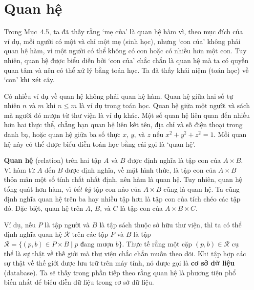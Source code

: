 \section{Quan hệ}

Trong Mục~4.5, ta đã thấy rằng `mẹ của' là quan hệ hàm vì, theo mục đích của ví dụ, mỗi người có một và chỉ một mẹ (sinh học), nhưng `con của' không phải quan hệ hàm, vì một người có thể không có con hoặc có nhiều hơn một con. Tuy nhiên, quan hệ được biểu diễn bởi `con của' chắc chắn là quan hệ mà ta có quyền quan tâm và nên có thể xử lý bằng toán học. Ta đã thấy khái niệm (toán học) về `con' khi xét cây.

Có nhiều ví dụ về quan hệ không phải quan hệ hàm. Quan hệ giữa hai số tự nhiên $n$ và $m$ khi $n \le m$ là ví dụ trong toán học. Quan hệ giữa một người và sách mà người đó mượn từ thư viện là ví dụ khác. Một số quan hệ liên quan đến nhiều hơn hai thực thể, chẳng hạn quan hệ liên kết tên, địa chỉ và số điện thoại trong danh bạ, hoặc quan hệ giữa ba số thực $x$, $y$, và $z$ nếu $x^2 + y^2 + z^2 = 1$. Mỗi quan hệ này có thể được biểu diễn toán học bằng cái gọi là `quan hệ'.

\textbf{Quan hệ} (relation) trên hai tập $A$ và $B$ được định nghĩa là tập con của $A \times B$. Vì hàm từ $A$ đến $B$ được định nghĩa, về mặt hình thức, là tập con của $A \times B$ thỏa mãn một số tính chất nhất định, nên hàm là quan hệ. Tuy nhiên, quan hệ tổng quát hơn hàm, vì \emph{bất kỳ} tập con nào của $A \times B$ cũng là quan hệ. Ta cũng định nghĩa quan hệ trên ba hay nhiều tập hơn là tập con của tích chéo các tập đó. Đặc biệt, quan hệ trên $A$, $B$, và $C$ là tập con của $A \times B \times C$.

\begin{example}
Ví dụ, nếu $P$ là tập người và $B$ là tập sách thuộc sở hữu thư viện, thì ta có thể định nghĩa quan hệ $\mathcal{R}$ trên các tập $P$ và $B$ là tập $\mathcal{R} = \{(p,b) \in P \times B \mid p \text{ đang mượn } b\}$. Thực tế rằng một cặp $(p,b) \in \mathcal{R}$ cụ thể là sự thật về thế giới mà thư viện chắc chắn muốn theo dõi. Khi tập hợp các sự thật về thế giới được lưu trữ trên máy tính, nó được gọi là \textbf{cơ sở dữ liệu} (database). Ta sẽ thấy trong phần tiếp theo rằng quan hệ là phương tiện phổ biến nhất để biểu diễn dữ liệu trong cơ sở dữ liệu.
\end{example}

